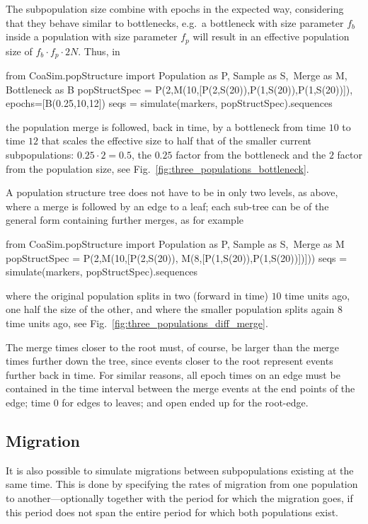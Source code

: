 \documentclass{manual}
\begin{document}
\begin{empfile}
The subpopulation size combine with epochs in the expected way,
considering that they behave similar to bottlenecks, e.g.\ a
bottleneck with size parameter $f_b$ inside a population with size
parameter $f_p$ will result in an effective population size of
$f_b\cdot{}f_p\cdot{}2N$.  Thus, in 
\begin{code}
from CoaSim.popStructure import Population as P, Sample as S,\
                                Merge as M, Bottleneck as B
popStructSpec = P(2,M(10,[P(2,S(20)),P(1,S(20)),P(1,S(20))]),
                  epochs=[B(0.25,10,12])
seqs = simulate(markers, popStructSpec).sequences
\end{code}
the population merge is followed, back in time, by a bottleneck from
time $10$ to time $12$ that scales the effective size to half that of
the smaller current subpopulations: $0.25\cdot{}2=0.5$, the $0.25$
factor from the bottleneck and the $2$ factor from the population
size, see Fig.~\ref{fig:three_populations_bottleneck}.

A population structure tree does not have to be in only two levels, as
above, where a merge is followed by an edge to a leaf; each sub-tree
can be of the general form containing further merges, as for example
\begin{code}
from CoaSim.popStructure import Population as P, Sample as S,\
                                Merge as M
popStructSpec = P(2,M(10,[P(2,S(20)), 
                          M(8,[P(1,S(20)),P(1,S(20))])]))
seqs = simulate(markers, popStructSpec).sequences
\end{code}
where the original population splits in two (forward in time) $10$
time units ago, one half the size of the other, and where the smaller
population splits again $8$ time units ago, see
Fig.~\ref{fig:three_populations_diff_merge}.

The merge times closer to the root must, of course, be larger than the
merge times further down the tree, since events closer to the root
represent events further back in time.  For similar reasons, all
epoch times on an edge must be contained in the time interval between
the merge events at the end points of the edge; time $0$ for edges to
leaves; and open ended up for the root-edge.


\subsection{Migration}
\label{sec:migration}

It is also possible to simulate migrations between subpopulations
existing at the same time.  This is done by specifying the rates of
migration from one population to another---optionally together with
the period for which the migration goes, if this period does not span
the entire period for which both populations exist.


\end{empfile}
\end{document}
